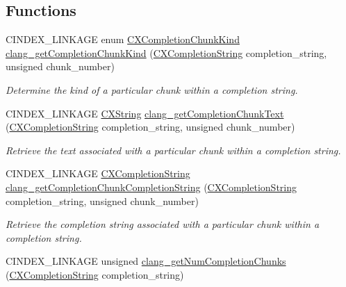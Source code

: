 \subsection*{Functions}
\begin{DoxyCompactItemize}
\item 
C\+I\+N\+D\+E\+X\+\_\+\+L\+I\+N\+K\+A\+GE enum \hyperlink{group__CINDEX__CODE__COMPLET_ga82570056548565efdd6fc74e57e75bbd}{C\+X\+Completion\+Chunk\+Kind} \hyperlink{group__CINDEX__CODE__COMPLET_gac61e18c6d895d85f1476c6091d486091}{clang\+\_\+get\+Completion\+Chunk\+Kind} (\hyperlink{group__CINDEX__CODE__COMPLET_gafea23a43a60ec3b4f3bedccfbb76883a}{C\+X\+Completion\+String} completion\+\_\+string, unsigned chunk\+\_\+number)
\begin{DoxyCompactList}\small\item\em Determine the kind of a particular chunk within a completion string. \end{DoxyCompactList}\item 
C\+I\+N\+D\+E\+X\+\_\+\+L\+I\+N\+K\+A\+GE \hyperlink{structCXString}{C\+X\+String} \hyperlink{group__CINDEX__CODE__COMPLET_ga98d4c869dda8fd4b5386f62d02d6ba0b}{clang\+\_\+get\+Completion\+Chunk\+Text} (\hyperlink{group__CINDEX__CODE__COMPLET_gafea23a43a60ec3b4f3bedccfbb76883a}{C\+X\+Completion\+String} completion\+\_\+string, unsigned chunk\+\_\+number)
\begin{DoxyCompactList}\small\item\em Retrieve the text associated with a particular chunk within a completion string. \end{DoxyCompactList}\item 
C\+I\+N\+D\+E\+X\+\_\+\+L\+I\+N\+K\+A\+GE \hyperlink{group__CINDEX__CODE__COMPLET_gafea23a43a60ec3b4f3bedccfbb76883a}{C\+X\+Completion\+String} \hyperlink{group__CINDEX__CODE__COMPLET_ga3063e36e81b3e14809f87bdc841a3a9d}{clang\+\_\+get\+Completion\+Chunk\+Completion\+String} (\hyperlink{group__CINDEX__CODE__COMPLET_gafea23a43a60ec3b4f3bedccfbb76883a}{C\+X\+Completion\+String} completion\+\_\+string, unsigned chunk\+\_\+number)
\begin{DoxyCompactList}\small\item\em Retrieve the completion string associated with a particular chunk within a completion string. \end{DoxyCompactList}\item 
\mbox{\label{group__CINDEX__CODE__COMPLET_ga76018aa1a7225268546e4d75dca5dbce}} 
C\+I\+N\+D\+E\+X\+\_\+\+L\+I\+N\+K\+A\+GE unsigned \hyperlink{group__CINDEX__CODE__COMPLET_ga76018aa1a7225268546e4d75dca5dbce}{clang\+\_\+get\+Num\+Completion\+Chunks} (\hyperlink{group__CINDEX__CODE__COMPLET_gafea23a43a60ec3b4f3bedccfbb76883a}{C\+X\+Completion\+String} completion\+\_\+string)

\end{DoxyCompactItemize}
